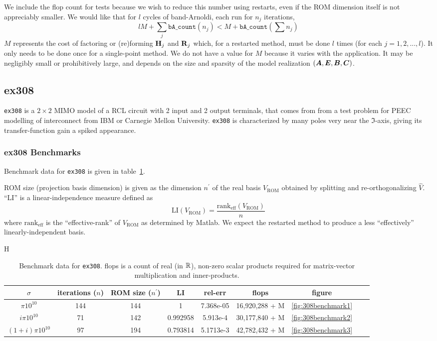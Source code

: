 We include the flop count for tests because we wish to reduce this number using restarts, even if the ROM dimension itself is not appreciably smaller.    We would like that for $l$ cycles of band-Arnoldi, each run for $n_j$ iterations, 
\[
  l M +\sum_j \texttt{bA\_count}(n_j)    
  <   M + \texttt{bA\_count}\left(\sum n_j \right)
\]
$M$ represents the cost of factoring or (re)forming $\textbf{\textup{H}}_j$ and $\textbf{\textup{R}}_j$ which, for a restarted method, must be done $l$ times (for each $j=1,2,...,l$).  It only needs to be done once for a single-point method. We do not have a value for $M$  because it varies with the application.  It may be negligibly small or prohibitively large, and depends on the size and sparsity of the model realization $(\bm{A},\bm{E},\bm{B},\bm{C})$. 

\subsection{ex308}
\texttt{ex308} is a $2\times2$  MIMO model of a RCL circuit with 2 input and 2 output terminals,  that comes from from a test problem for PEEC modelling of interconnect from IBM or Carnegie Mellon University.   
\texttt{ex308} is characterized by many poles very near the $\Im$-axis, giving its transfer-function gain a spiked appearance.
 
\subsubsection{ex308 Benchmarks}
   Benchmark data for \texttt{ex308} is given in table~\ref{tab:308tab1}.  

ROM size (projection basis dimension) is given as the dimension $n^\prime$ of the real basis $V_{\text{ROM}}$ obtained by splitting and re-orthogonalizing $\widehat{V}$.  ``LI'' is a linear-independence measure defined as 
\[\text{LI}\left(V_{\text{ROM}}\right) =
\frac{\text{rank}_\text{eff}\left(V_{\text{ROM}}\right)}{n}
\]  
where $\text{rank}_\text{eff}$ is the ``effective-rank'' of $V_{\text{ROM}}$ as determined by Matlab.  We expect the restarted method to produce a less ``effectively'' linearly-independent basis. 
 
\begin{table}{H}
\centering
\begin{tabular}{|c|c|c|c|c|c|c|c|c|}
\hline
$\sigma$ & iterations ($n$) & ROM size ($n^\prime$) & LI  & rel-err  & flops & figure  \\
\hline
$\pi 10^{10}$  & 144  &144 & 1 &7.368e-05   &  16,920,288 + M& \ref{fig:308benchmark1}  \\
$i \pi  10^{10}$ &  71 &142 & 0.992958 &5.913e-4 & 30,177,840 + M  &\ref{fig:308benchmark2} \\
$(1+i)\pi 10^{10}$ & 97 & 194& 0.793814&5.1713e-3 &  42,782,432 + M&\ref{fig:308benchmark3} \\
\hline
\end{tabular}
\caption{\label{tab:308tab1}Benchmark data for \texttt{ex308}.  flops is a count of real (in $\mathbb{R}$), non-zero scalar products required for matrix-vector multiplication and inner-products.    }
\end{table}



